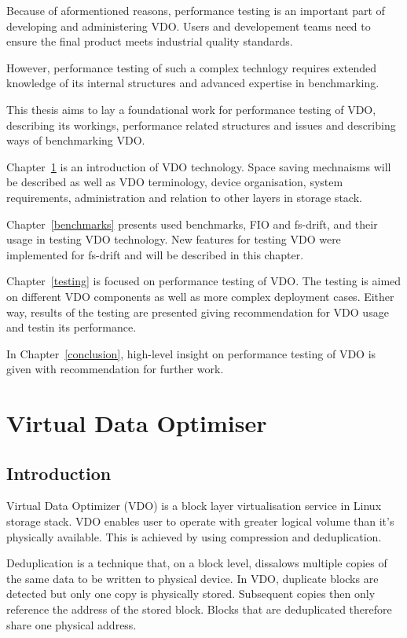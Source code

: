 \documentclass[
  color, %
  table, %
  lof,   %
  lot,   %
]{fithesis3}
\begin{document}
Because of aformentioned reasons, performance testing is an important part of developing and administering VDO. Users and developement teams need to ensure the final product meets industrial quality standards.

However, performance testing of such a complex technlogy requires extended knowledge of its internal structures and advanced expertise in benchmarking. 

This thesis aims to lay a foundational work for performance testing of VDO, describing its workings, performance related structures and issues and describing ways of benchmarking VDO. 

Chapter~\ref{VDO} is an introduction of VDO technology. Space saving mechnaisms will be described as well as VDO terminology, device organisation, system requirements, administration and relation to other layers in storage stack.

Chapter~\ref{benchmarks} presents used benchmarks, FIO and fs-drift, and their usage in testing VDO technology. New features for testing VDO were implemented for fs-drift and will be described in this chapter.

Chapter~\ref{testing} is focused on performance testing of VDO. The testing is aimed on different VDO components as well as more complex deployment cases. Either way, results of the testing are presented giving recommendation for VDO usage and testin its performance.

In Chapter~\ref{conclusion}, high-level insight on performance testing of VDO is given with recommendation for further work.


\chapter{Virtual Data Optimiser}
\label{VDO}
\section{Introduction}
Virtual Data Optimizer (VDO) is a block layer virtualisation service in Linux storage stack. VDO enables user to operate with greater logical volume than it's physically available. This is achieved by using compression and deduplication.

Deduplication is a technique that, on a block level, dissalows multiple copies of the same data to be written to physical device. In VDO, duplicate blocks are detected but only one copy is physically stored. Subsequent copies then only reference the address of the stored block. Blocks that are deduplicated therefore share one physical address.
\end{document}
